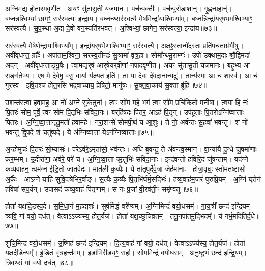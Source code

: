 अ॒ग्निम॒द्य होता॑रमवृणीत।
अ॒यꣳ सु॑तासु॒ती यज॑मानः।
पच॑न्प॒क्तीः।
पच॑न्पुरो॒डाशान्॑।
गृ॒ह्णन्ग्रहान्॑।
ब॒ध्नन्न॒श्विभ्यां॒ छाग॒ꣳ॒ सर॑स्वत्या॒ इन्द्रा॑य।
ब॒ध्नन्थ्सर॑स्वत्यै मे॒षमिन्द्रा॑या॒श्वि\-भ्या᳚म्।
ब॒ध्नन्निन्द्रा॑यर्‌\mbox{}ष॒भम॒श्विभ्या॒ꣳ॒ सर॑स्वत्यै।
सू॒प॒स्था अ॒द्य दे॒वो वन॒स्पति॑रभवत्।
अ॒श्विभ्यां॒ छागे॑न॒ सर॑स्वत्या॒ इन्द्रा॑य॥७३॥\ip

सर॑स्वत्यै मे॒षेणेन्द्रा॑या॒श्विभ्या᳚म्।
इन्द्रा॑यर्‌\mbox{}ष॒भेणा॒श्विभ्या॒ꣳ॒ सर॑स्वत्यै।
अक्ष॒ꣴ॒स्तान्मे॑द॒स्तः प्रति॑\-पच॒ताग्र॑भीषुः।
अवी॑वृधन्त॒ ग्रहैः᳚।
अपा॑ता\-म॒श्विना॒ सर॑स्व॒तीन्द्रः॑ सु॒त्रामा॑ वृत्र॒हा।
सोमा᳚न्थ्सु॒राम्णः॑।
उपो॑ उक्थाम॒दाः श्रौ॒द्विमदा॑ अदन्।
अवी॑वृधन्ताङ्गू॒षैः।
त्वाम॒द्यर्‌\mbox{}ष॑ आर्‌\mbox{}षेयर्‌\mbox{}षीणां नपादवृणीत।
अ॒यꣳ सु॑तासु॒ती यज॑मानः।
ब॒हुभ्य॒ आ सङ्ग॑तेभ्यः।
ए॒ष मे॑ दे॒वेषु॒ वसु॒ वार्या य॑क्ष्यत॒ इति॑।
ता या दे॒वा दे॑व॒दाना॒न्यदुः॑।
तान्य॑स्मा॒ आ च॒ शास्व॑।
आ च॑ गुरस्व।
इ॒षि॒तश्च॑ होत॒रसि॑ भद्र॒वाच्या॑य॒ प्रेषि॑तो॒ मानु॑षः।
सू॒क्त॒वा॒काय॑ सू॒क्ता ब्रू॑हि॥७४॥\ip\anuvakamend[इन्द्रा॑य॒ यज॑मानः स॒प्त च॑]

उ॒शन्त॑स्त्वा हवामह॒ आ नो॑ अग्ने सुके॒तुना᳚।
त्वꣳ सो॑म म॒हे भगं॒ त्वꣳ सो॑म॒ प्रचि॑कितो मनी॒षा।
त्वया॒ हि नः॑ पि॒तरः॑ सोम॒ पूर्वे॒ त्वꣳ सो॑म पि॒तृभिः॑ संविदा॒नः।
बर्‌\mbox{}हि॑षदः पितर॒ आऽहं पि॒तॄन्।
उप॑हूताः पि॒तरो\-ऽग्नि॑ष्वात्ताः पितरः।
अ॒ग्नि॒ष्वा॒त्तानृ॑तु॒मतो॑ हवामहे।
नरा॒शꣳसे॑ सोमपी॒थं य आ॒शुः।
ते नो॒ अर्व॑न्तः सु॒हवा॑ भवन्तु।
शं नो॑ भवन्तु द्वि॒पदे॒ शं चतु॑ष्पदे।
ये अ॑ग्निष्वा॒त्ता येऽन॑ग्निष्वात्ताः॥७५॥\ip

अ॒ꣳ॒हो॒मुचः॑ पि॒तरः॑ सो॒म्यासः॑।
परेऽव॑रे॒\-ऽमृता॑सो॒ भव॑न्तः।
अधि॑ ब्रुवन्तु॒ ते अ॑वन्त्व॒स्मान्।
वा॒न्या॑यै दु॒ग्धे जु॒षमा॑णाः कर॒म्भम्।
उ॒दीरा॑णा॒ अव॑रे॒ परे॑ च।
अ॒ग्नि॒ष्वा॒त्ता ऋ॒तुभिः॑ संविदा॒नाः।
इन्द्र॑वन्तो ह॒विरि॒दं जु॑षन्ताम्।
यद॑ग्ने कव्यवाहन॒ त्वम॑ग्न ईडि॒तो जा॑तवेदः।
मात॑ली क॒व्यैः।
ये ता॑तृ॒पुर्दे॑व॒त्रा जेह॑मानाः।
हो॒त्रा॒वृधः॒ स्तोम॑तष्टासो अ॒र्कैः।
आऽग्ने॑ याहि सुवि॒दत्रे॑भिर॒र्वाङ्।
स॒त्यैः क॒व्यैः पि॒तृभि॑र्घर्म॒सद्भिः॑।
ह॒व्य॒वाह॑म॒जरं॑ पुरुप्रि॒यम्।
अ॒ग्निं घृ॒तेन॑ ह॒विषा॑ सप॒र्यन्।
उपा॑सदं कव्य॒वाहं॑ पितृ॒णाम्।
स नः॑ प्र॒जां वी॒रव॑ती॒ꣳ॒ समृ॑ण्वतु॥७६॥\ip\anuvakamend[अन॑ग्निष्वात्ता॒ जेह॑मानाः स॒प्त च॑]

होता॑ यक्षदि॒डस्प॒दे।
स॒मि॒धा॒नं म॒हद्यशः॑।
सुष॑मिद्धं॒ वरे᳚ण्यम्।
अ॒ग्निमिन्द्रं॑ वयो॒धसम्᳚।
गा॒य॒त्रीं छन्द॑ इन्द्रि॒यम्।
त्र्यविं॒ गां वयो॒ दध॑त्।
वेत्वा\-ऽ\-ऽ\-ज्य॑स्य॒ होत॒र्यज॑।
होता॑ यक्ष॒च्छुचि॑व्रतम्।
तनू॒नपा॑तमु॒द्भिदम्᳚।
यं गर्भ॒मदि॑तिर्द॒धे॥७७॥\ip

शुचि॒मिन्द्रं॑ वयो॒धसम्᳚।
उ॒ष्णिहं॒ छन्द॑ इन्द्रि॒यम्।
दि॒त्य॒वाहं॒ गां वयो॒ दध॑त्।
वेत्वा\-ऽ\-ऽ\-ज्य॑स्य॒ होत॒र्यज॑।
होता॑ यक्षदी॒डेन्यम्᳚।
ई॒डि॒तं वृ॑त्र॒हन्त॑मम्।
इडा॑भि॒रीड्य॒ꣳ॒ सहः॑।
सोम॒मिन्द्रं॑ वयो॒धसम्᳚।
अ॒नु॒ष्टुभं॒ छन्द॑ इन्द्रि॒यम्।
त्रि॒व॒थ्सं गां वयो॒ दध॑त्॥७८॥\ip

